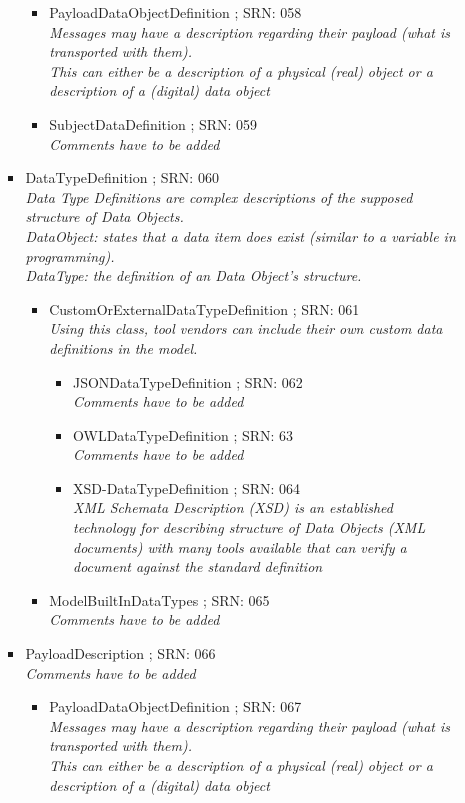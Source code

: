 \begin{itemize}
\begin{itemize}
\begin{itemize}
\begin{itemize}
					\item PayloadDataObjectDefinition ; SRN: 058 \\ \textit{Messages may have a description regarding their payload (what is transported with them).\\This can either be a description of a physical (real) object or a description of a (digital) data object}
					\item SubjectDataDefinition ; SRN: 059 \\ \textit{Comments have to be added}
				\end{itemize}
				\item DataTypeDefinition ; SRN: 060 \\ \textit{Data Type Definitions are complex descriptions of the supposed structure of Data Objects. \\ DataObject: states that a data item does exist (similar to a variable in programming). \\DataType: the definition of an Data Object's structure.}
				\begin{itemize}
					\item CustomOrExternalDataTypeDefinition ; SRN: 061 \\ \textit{Using this class, tool vendors can include their own custom data definitions in the model.}
					\begin{itemize}
						\item JSONDataTypeDefinition ; SRN: 062 \\ \textit{Comments have to be added}
						\item OWLDataTypeDefinition ; SRN: 63 \\ \textit{Comments have to be added}
						\item XSD-DataTypeDefinition ; SRN: 064 \\ \textit{XML Schemata Description (XSD) is an established technology for describing structure of Data Objects (XML documents) with many tools available that can verify a document against the standard definition}
					\end{itemize}
					\item ModelBuiltInDataTypes ; SRN: 065 \\ \textit{Comments have to be added}
				\end{itemize}
				\item PayloadDescription ; SRN: 066 \\ \textit{Comments have to be added}
				\begin{itemize}
					\item PayloadDataObjectDefinition ; SRN: 067 \\ \textit{Messages may have a description regarding their payload (what is transported with them).\\This can either be a description of a physical (real) object or a description of a (digital) data object}

\end{itemize}
\end{itemize}
\end{itemize}
\end{itemize}
